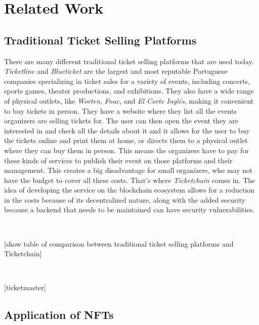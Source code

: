 \section{Related Work}

\subsection{Traditional Ticket Selling Platforms}

There are many different traditional ticket selling platforms that are used today. \emph{Ticketline} and \emph{Blueticket} are the largest and most reputable Portuguese companies specializing in ticket sales for a variety of events, including concerts, sports games, theater productions, and exhibitions. They also have a wide range of physical outlets, like \emph{Worten}, \emph{Fnac}, and \emph{El Corte Inglés}, making it convenient to buy tickets in person.
They have a website where they list all the events organizers are selling tickets for. The user can then open the event they are interested in and check all the details about it and it allows for the user to buy the tickets online and print them at home, or directs them to a physical outlet where they can buy them in person.
This means the organizers have to pay for these kinds of services to publish their event on those platforms and their management. This creates a big disadvantage for small organizers, who may not have the budget to cover all these costs.
That's where \emph{Ticketchain} comes in. The idea of developing the service on the blockchain ecosystem allows for a reduction in the costs because of its decentralized nature, along with the added security because a backend that needs to be maintained can have security vulnerabilities.

~

[show table of comparison between traditional ticket selling platforms and Ticketchain]

~

[ticketmaster]

\subsection{Application of NFTs}